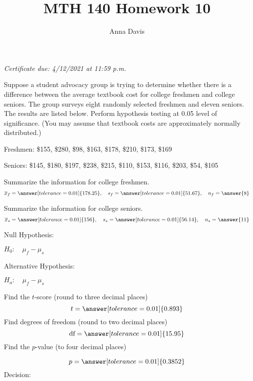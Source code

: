 \documentclass{ximera}
\author{Anna Davis} \title{MTH 140 Homework 10}
\begin{document}
\begin{abstract}

\end{abstract}
\maketitle
 \textit{Certificate due: 4/12/2021 at 11:59 p.m.}
 \begin{problem}\label{prob:140hom9prob1}
Suppose a student advocacy group is trying to determine whether there is a difference between the average textbook cost for college freshmen and college seniors.  The group surveys eight randomly selected freshmen and eleven seniors.  The results are listed below.  Perform hypothesis testing at 0.05 level of significance. (You may assume that textbook costs are approximately normally distributed.)

Freshmen: \$155, \$280, \$98, \$163, \$178, \$210, \$173, \$169

Seniors: \$145, \$180, \$197, \$238, \$215, \$110, \$153, \$116, \$203, \$54, \$105  

Summarize the information for college freshmen.
$$\overline{x}_f=\answer[tolerance=0.01]{178.25},\quad s_f=\answer[tolerance=0.01]{51.67},\quad n_f=\answer{8}$$

Summarize the information for college seniors.
$$\overline{x}_s=\answer[tolerance=0.01]{156},\quad s_s=\answer[tolerance=0.01]{56.14},\quad n_s=\answer{11}$$

Null Hypothesis:

$H_0:\quad \mu_f-\mu_s$ 

Alternative Hypothesis:

$H_a:\quad \mu_f-\mu_s$ 

Find the $t$-score (round to three decimal places)
$$t=\answer[tolerance=0.01]{0.893}$$
Find degrees of freedom (round to two decimal places)
$$\mbox{df}=\answer[tolerance=0.01]{15.95}$$
Find the $p$-value (to four decimal places)
\begin{center}  
\end{center}
$$p=\answer[tolerance=0.01]{0.3852}$$
Decision:

\begin{multipleChoice} 
\end{multipleChoice}  


\end{problem}
\end{document}
